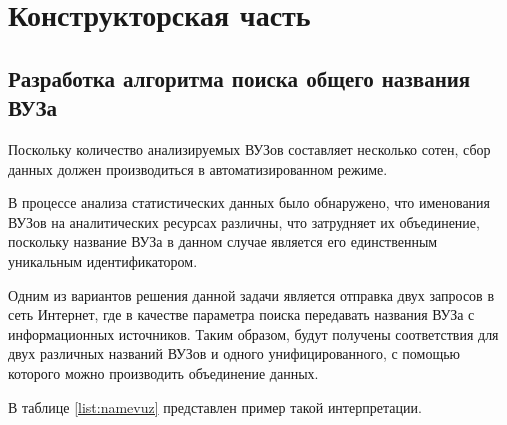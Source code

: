 \section{Конструкторская часть}

\subsection{Разработка алгоритма поиска общего названия ВУЗа}

Поскольку количество анализируемых ВУЗов составляет несколько сотен, сбор данных должен производиться в автоматизированном режиме.

В процессе анализа статистических данных было обнаружено, что именования ВУЗов на аналитических ресурсах различны, что затрудняет их объединение, поскольку название ВУЗа в данном случае является его единственным уникальным идентификатором. 

Одним из вариантов решения данной задачи является отправка двух запросов в сеть Интернет, где в качестве параметра поиска передавать названия ВУЗа с информационных источников. Таким образом, будут получены соответствия для двух различных названий ВУЗов и одного унифицированного, с помощью которого можно производить объединение данных.

В таблице \ref{list:namevuz} представлен пример такой интерпретации.

